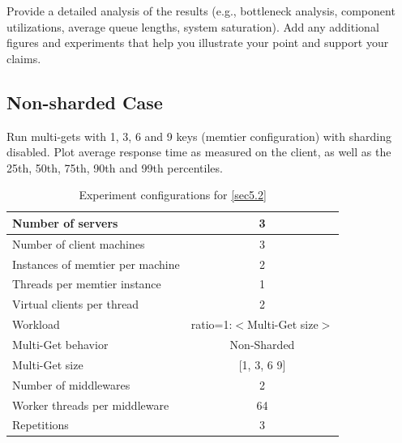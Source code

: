 \documentclass[11pt,a4paper]{article}
\begin{document}
Provide a detailed analysis of the results (e.g., bottleneck analysis, component utilizations, average queue lengths, system saturation). Add any additional figures and experiments that help you illustrate your point and support your claims.

\subsection{Non-sharded Case} \label{sec5.2}

Run multi-gets with 1, 3, 6 and 9 keys (memtier configuration) with sharding disabled. Plot average response time as measured on the client, as well as the 25th, 50th, 75th, 90th and 99th percentiles.

\begin{center}
    \begin{table}
        \centering
    	\begin{tabular}{|l|c|}
    		\hline Number of servers                & 3                            \\ 
    		\hline Number of client machines        & 3                            \\ 
    		\hline Instances of memtier per machine & 2                            \\ 
    		\hline Threads per memtier instance     & 1                            \\
    		\hline Virtual clients per thread       & 2                		       \\ 
    		\hline Workload                         & ratio=1:$<$Multi-Get size$>$ \\
    		\hline Multi-Get behavior               & Non-Sharded                  \\
    		\hline Multi-Get size                   & [1, 3, 6 9]                  \\
    		\hline Number of middlewares            & 2                            \\
    		\hline Worker threads per middleware    & 64                           \\
    		\hline Repetitions                      & 3                            \\ 
    		\hline 
    	\end{tabular}
    	\caption{Experiment configurations for \autoref{sec5.2}} \label{exp5-2}
    \end{table}
\end{center}
\end{document}
